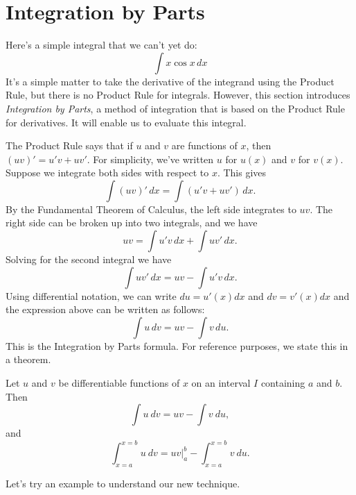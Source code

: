 \section{Integration by Parts}\label{sec:IBP}

Here's a simple integral that we can't yet do:
$$\int x\cos x \,dx$$
It's a simple matter to take the derivative of the integrand using the Product Rule, but there is no Product Rule for integrals.  However, this section introduces \textit{Integration by Parts}, a method of integration that is based on the Product Rule for derivatives. It will enable us to evaluate this integral.

The Product Rule says that if $u$ and $v$ are functions of $x$, then  $(uv)' = u'v + uv'$.  For simplicity, we've written $u$ for $u(x)$ and $v$ for $v(x)$.  Suppose we integrate both sides with respect to $x$.  This gives
$$\int (uv)'\,dx = \int (u'v+uv')\,dx.$$
By the Fundamental Theorem of Calculus, the left side integrates to $uv$.  The right side can be broken up into two integrals, and we have
$$uv = \int u'v\,dx + \int uv'\,dx.$$
Solving for the second integral we have 
$$\int uv'\,dx = uv - \int u'v\,dx.$$
Using differential notation, we can write $du = u'(x)dx$ and $dv=v'(x)dx$ and the expression above can be written as follows:
$$\int u\,dv = uv - \int v\,du.$$
This is the Integration by Parts formula. For reference purposes, we state this in a theorem.

{Let $u$ and $v$ be differentiable functions of $x$ on an interval $I$ containing $a$ and $b$. Then 
$$\int u\ dv = uv - \int v\ du,$$ and 
$$\int_{x=a}^{x=b} u\ dv = uv\Big|_a^b - \int_{x=a}^{x=b}v\ du.$$
}

Let's try an example to understand our new technique.\\
\enlargethispage{\baselineskip}

